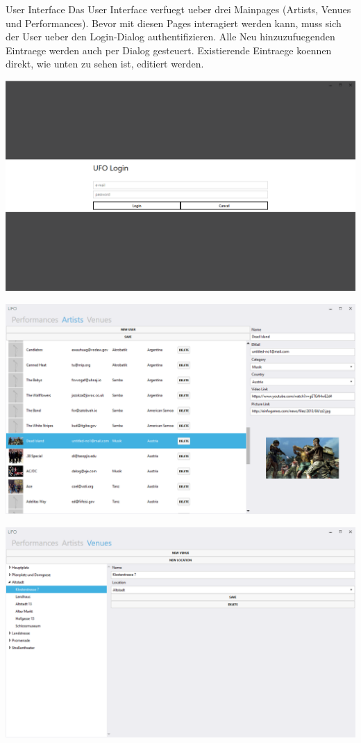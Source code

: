 \begin{section}{User Interface}
Das User Interface verfuegt ueber drei Mainpages (Artists, Venues und Performances). Bevor mit diesen Pages interagiert werden kann, muss sich der User ueber den Login-Dialog authentifizieren. Alle Neu hinzuzufuegenden Eintraege werden auch per Dialog gesteuert. Existierende Eintraege koennen direkt, wie unten zu sehen ist, editiert werden.


\includegraphics[angle=0, scale=0.45]{./img/viewlogin.PNG}
\FloatBarrier

\includegraphics[angle=0, scale=0.45]{./img/viewartist.PNG}
\FloatBarrier

\includegraphics[angle=0, scale=0.45]{./img/viewvenue.PNG}
\FloatBarrier


\end{section}
